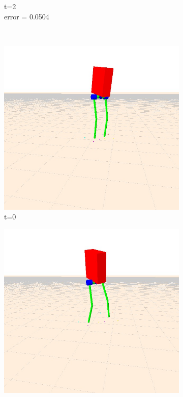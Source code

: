 \documentclass[letterpaper, 10 pt, conference]{ieeeconf}  %
\begin{document}
\begin{figure}[t]
\begin{subfigure}[b]{0.3\textwidth}
    \caption{t=2\\error = 0.0504}
    \label{fig:balanceNoYaw3}
  \end{subfigure} \\
  \begin{subfigure}[b]{0.3\textwidth}
    \centering
        \includegraphics[width=\textwidth] {figures/balanceYaw1.jpg}
        \caption{t=0}
    \label{fig:balanceYaw1}
    \end{subfigure}\hfill
    \begin{subfigure}[b]{0.3\textwidth}
    \centering
        \includegraphics[width=\textwidth] {figures/balanceYaw2.jpg}

\end{subfigure}
\end{figure}
\end{document}
